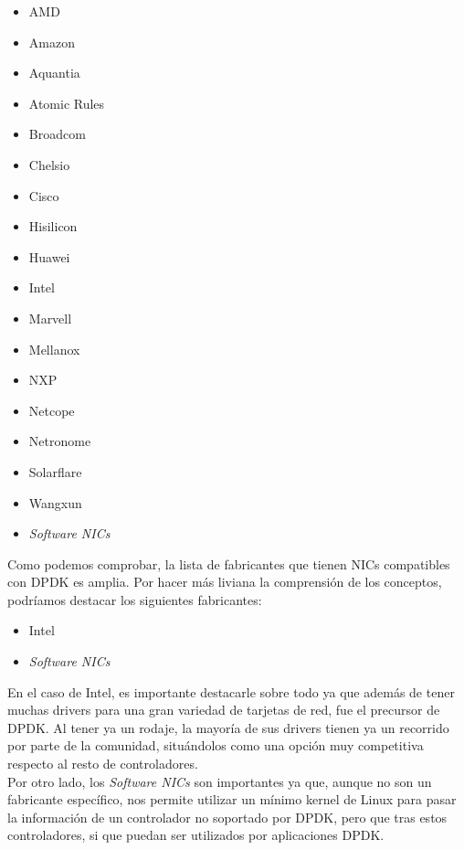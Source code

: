 \documentclass[12pt]{article}
\begin{document}
	\begin{multicols}{2}
		\begin{itemize}
			\item AMD
			\item Amazon
			\item Aquantia
			\item Atomic Rules
			\item Broadcom
			\item Chelsio
			\item Cisco
			\item Hisilicon
			\item Huawei
			\item Intel
			\item Marvell
			\item Mellanox
			\item NXP
			\item Netcope
			\item Netronome
			\item Solarflare
			\item Wangxun
			\item \textit{Software NICs}
		\end{itemize}
	\end{multicols}

	\noindent Como podemos comprobar, la lista de fabricantes que tienen NICs compatibles con DPDK es amplia. Por hacer más liviana la comprensión de los conceptos, podríamos destacar los siguientes fabricantes:
	\begin{itemize}
		\item Intel
		\item \textit{Software NICs}
	\end{itemize}

	\pagebreak
	
	\noindent En el caso de Intel, es importante destacarle sobre todo ya que además de tener muchas drivers para una gran variedad de tarjetas de red, fue el precursor de DPDK. Al tener ya un rodaje, la mayoría de sus drivers tienen ya un recorrido por parte de la comunidad, situándolos como una opción muy competitiva respecto al resto de controladores.\\
	
	 \noindent Por otro lado, los \textit{Software NICs} son importantes ya que, aunque no son un fabricante específico, nos permite utilizar un mínimo kernel de Linux para pasar la información de un controlador no soportado por DPDK, pero que tras estos controladores, si que puedan ser utilizados por aplicaciones DPDK. \\
	 
\end{document}

